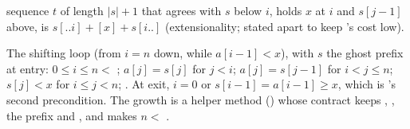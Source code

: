 \documentclass[11pt]{article}
\begin{document}
\begin{description}
\begin{itemize}
    sequence $t$ of length $|s| + 1$ that agrees with $s$ below $i$, holds
    $x$ at $i$ and $s[j - 1]$ above, is $s[..i] + [x] + s[i..]$
    (extensionality; stated apart to keep 's cost low).
  \end{itemize}
  The shifting loop (from $i = n$ down, while $a[i - 1] < x$), with
  $s$ the ghost prefix at entry: $0 \le i \le n < $ ;
  $a[j] = s[j]$ for $j < i$; $a[j] = s[j - 1]$ for $i < j \le n$;
  $s[j] < x$ for $i \le j < n$; . At exit, $i = 0$ or
  $s[i - 1] = a[i - 1] \ge x$, which is 's second
  precondition. The growth is a helper method () whose contract
  keeps , , the prefix and , and makes
  $n < $ .
\end{description}
\end{document}
